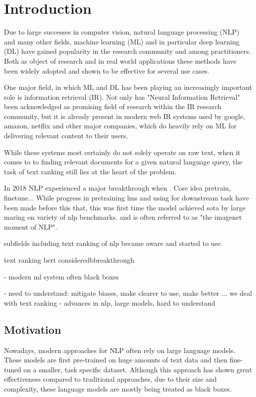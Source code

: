 \chapter{Introduction}
Due to large successes in computer vision, natural language processing (NLP) and many other fields, machine learning (ML) and in particular deep learning (DL) have gained popularity in the research community and among practitioners. Both as object of research and in real world applications these methods have been widely adopted and shown to be effective for several use cases.

One major field, in which ML and DL has been playing an increasingly important role is information retrieval (IR). Not only has "Neural Information Retrieval" \cite{mitra2018an} been acknowledged as promising field of research within the IR research community, but it is already present in modern web IR systems used by google, amazon, netflix and other major companies, which do heavily rely on ML for delivering relevant content to their users.

While these systems most certainly do not solely operate on raw text, when it comes to to finding relevant documents for a given natural language query, the task of text ranking still lies at the heart of the problem.

In 2018 NLP experienced a major breakthrough when \cite{devlin-etal-2019-bert}. Core idea pretrain, finetune...
While progress in pretraining lms and using for downstream task have been made before this that, this was first time the model achieved sota by large maring on variety of nlp benchmarks. and is often referred to as "the imagenet moment of NLP".

subfields including text ranking of nlp became aware and started to use.


text ranking
bert consideredbbreakthrough

- modern ml system often black boxes

- need to understand: mitigate biases, make clearer to use, make better
... we deal with text ranking
- advances in nlp, large models, hard to understand

\section{Motivation}
Nowadays, modern approaches for NLP often rely on large language models. These models are first pre-trained on huge amounts of text data and then fine-tuned on a smaller, task specific dataset. Although this approach has shown great effectiveness compared to traditional approaches, due to their size and complexity, these language models are mostly being treated as black boxes.

